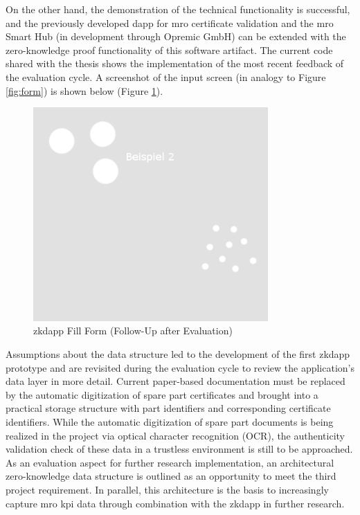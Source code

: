 On the other hand, the demonstration of the technical functionality is successful, and the previously developed \acrshort{dapp} for \acrshort{mro} certificate validation and the \acrshort{mro} Smart Hub (in development through Opremic GmbH) can be extended with the zero-knowledge proof functionality of this software artifact. The current code shared with the thesis shows the implementation of the most recent feedback of the evaluation cycle. A screenshot of the input screen (in analogy to Figure \ref{fig:form}) is shown below (Figure \ref{fig:form1}).
\begin{figure}[hbt]
	\centering
		\includegraphics[width=0.8\textwidth]{Pictures/bsp2.png}
	\caption{\acrshort{zkdapp} Fill Form (Follow-Up after Evaluation)}
	\label{fig:form1}
\end{figure}
Assumptions about the data structure led to the development of the first \acrshort{zkdapp} prototype and are revisited during the evaluation cycle to review the application's data layer in more detail. Current paper-based documentation must be replaced by the automatic digitization of spare part certificates and brought into a practical storage structure with part identifiers and corresponding certificate identifiers. While the automatic digitization of spare part documents is being realized in the project via optical character recognition (OCR), the authenticity validation check of these data in a trustless environment is still to be approached. As an evaluation aspect for further research implementation, an architectural zero-knowledge data structure is outlined as an opportunity to meet the third project requirement. In parallel, this architecture is the basis to increasingly capture \acrshort{mro} \acrshort{kpi} data through combination with the \acrshort{zkdapp} in further research. 

